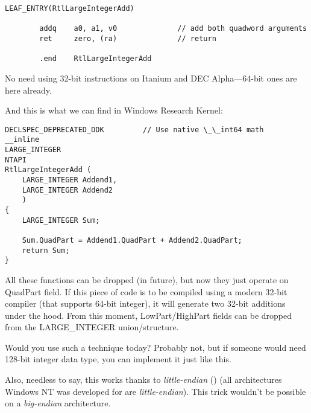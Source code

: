 \begin{lstlisting}[caption=DEC Alpha arch]
        LEAF_ENTRY(RtlLargeIntegerAdd)

        addq    a0, a1, v0              // add both quadword arguments
        ret     zero, (ra)              // return

        .end    RtlLargeIntegerAdd
\end{lstlisting}

No need using 32-bit instructions on Itanium and DEC Alpha---64-bit ones are here already.

And this is what we can find in Windows Research Kernel:

\begin{lstlisting}[style=customc]
DECLSPEC_DEPRECATED_DDK         // Use native \_\_int64 math
__inline
LARGE_INTEGER
NTAPI
RtlLargeIntegerAdd (
    LARGE_INTEGER Addend1,
    LARGE_INTEGER Addend2
    )
{
    LARGE_INTEGER Sum;

    Sum.QuadPart = Addend1.QuadPart + Addend2.QuadPart;
    return Sum;
}
\end{lstlisting}

All these functions can be dropped (in future), but now they just operate on QuadPart field.
If this piece of code is to be compiled using a modern 32-bit compiler (that supports 64-bit integer),
it will generate two 32-bit additions under the hood.
From this moment, LowPart/HighPart fields can be dropped from the LARGE\_INTEGER union/structure.

Would you use such a technique today?
Probably not, but if someone would need 128-bit integer data type, you can implement it just like this.

Also, needless to say, this works thanks to \emph{little-endian} ()
(all architectures Windows NT was developed for are \emph{little-endian}).
This trick wouldn't be possible on a \emph{big-endian} architecture.

